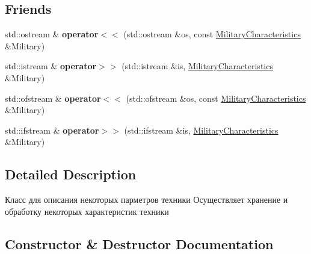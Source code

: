 \subsection*{Friends}
\begin{DoxyCompactItemize}
\item 
\mbox{\label{class_aircraft_carrier_group_1_1_military_characteristics_a41b44d946c935e5b0f2bf78e75cb079d}} 
std\+::ostream \& {\bfseries operator$<$$<$} (std\+::ostream \&os, const \mbox{\hyperlink{class_aircraft_carrier_group_1_1_military_characteristics}{Military\+Characteristics}} \&Military)
\item 
\mbox{\label{class_aircraft_carrier_group_1_1_military_characteristics_a9bf2dba162f5eb248157d479e26f1fa8}} 
std\+::istream \& {\bfseries operator$>$$>$} (std\+::istream \&is, \mbox{\hyperlink{class_aircraft_carrier_group_1_1_military_characteristics}{Military\+Characteristics}} \&Military)
\item 
\mbox{\label{class_aircraft_carrier_group_1_1_military_characteristics_acfb674eca6b7f8071cec488969f873ce}} 
std\+::ofstream \& {\bfseries operator$<$$<$} (std\+::ofstream \&os, const \mbox{\hyperlink{class_aircraft_carrier_group_1_1_military_characteristics}{Military\+Characteristics}} \&Military)
\item 
\mbox{\label{class_aircraft_carrier_group_1_1_military_characteristics_a2deb6a3df02cd7aa1806b6d7c3396f5f}} 
std\+::ifstream \& {\bfseries operator$>$$>$} (std\+::ifstream \&is, \mbox{\hyperlink{class_aircraft_carrier_group_1_1_military_characteristics}{Military\+Characteristics}} \&Military)
\end{DoxyCompactItemize}


\subsection{Detailed Description}
Класс для описания некоторых парметров техники  Осуществляет хранение и обработку некоторых характеристик техники 

\subsection{Constructor \& Destructor Documentation}
\mbox{\label{class_aircraft_carrier_group_1_1_military_characteristics_a6bd6050279bfeb4b19a65521954a6fd3}} 
